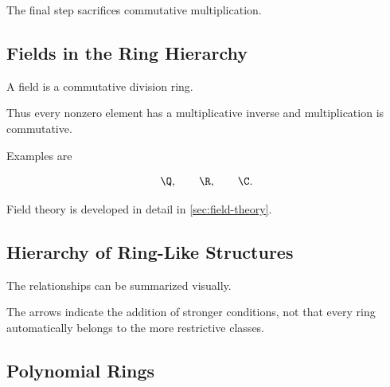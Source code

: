 The final step sacrifices commutative multiplication.

\subsection{Fields in the Ring Hierarchy}
\label{subsec:fields-ring-hierarchy}

A field is a commutative division ring.

Thus every nonzero element has a multiplicative inverse and multiplication is
commutative.

Examples are

\[ \Q,\qquad\R,\qquad\C. \]

Field theory is developed in detail in \cref{sec:field-theory}.

\subsection{Hierarchy of Ring-Like Structures}
\label{subsec:ring-hierarchy}

The relationships can be summarized visually.

\begin{center}
\end{center}

The arrows indicate the addition of stronger conditions, not that every ring
automatically belongs to the more restrictive classes.

\subsection{Polynomial Rings}
\label{subsec:polynomial-rings}


